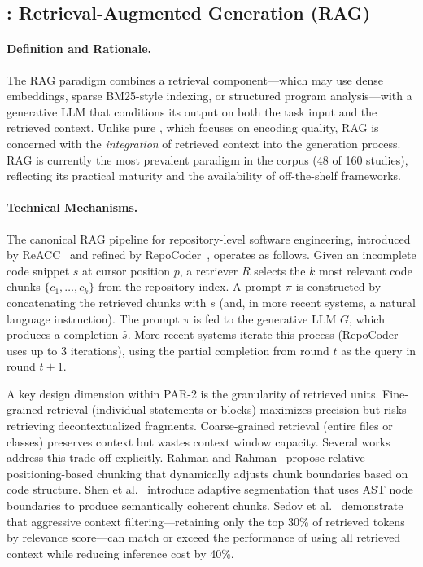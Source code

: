 \subsection{: Retrieval-Augmented Generation (RAG)}
\label{subsec:par2}

\paragraph{Definition and Rationale.}
The RAG paradigm combines a retrieval component---which may use dense embeddings, sparse
BM25-style indexing, or structured program analysis---with a generative LLM that conditions
its output on both the task input and the retrieved context. Unlike pure , which
focuses on encoding quality, RAG is concerned with the \emph{integration} of retrieved context
into the generation process. RAG is currently the most prevalent paradigm in the corpus (48 of
160 studies), reflecting its practical maturity and the availability of off-the-shelf frameworks.

\paragraph{Technical Mechanisms.}
The canonical RAG pipeline for repository-level software engineering, introduced by
ReACC~\cite{lu2022reacc} and refined by RepoCoder~\cite{zhang2023repocoder}, operates as
follows. Given an incomplete code snippet $s$ at cursor position $p$, a retriever $R$ selects
the $k$ most relevant code chunks $\{c_1, \ldots, c_k\}$ from the repository index. A prompt
$\pi$ is constructed by concatenating the retrieved chunks with $s$ (and, in more recent
systems, a natural language instruction). The prompt $\pi$ is fed to the generative LLM $G$,
which produces a completion $\hat{s}$. More recent systems iterate this process (RepoCoder uses
up to 3 iterations), using the partial completion from round $t$ as the query in round $t+1$.

A key design dimension within PAR-2 is the granularity of retrieved units. Fine-grained
retrieval (individual statements or blocks) maximizes precision but risks retrieving decontextualized
fragments. Coarse-grained retrieval (entire files or classes) preserves context but wastes
context window capacity. Several works address this trade-off explicitly. Rahman and
Rahman~\cite{rahman2025relative} propose relative positioning-based chunking that dynamically
adjusts chunk boundaries based on code structure. Shen et al.~\cite{shen2025repository}
introduce adaptive segmentation that uses AST node boundaries to produce semantically coherent
chunks. Sedov et al.~\cite{sedov2025importance} demonstrate that aggressive context
filtering---retaining only the top 30\% of retrieved tokens by relevance score---can match
or exceed the performance of using all retrieved context while reducing inference cost by 40\%.

